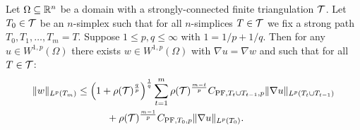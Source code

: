 \documentclass[12pt,a4paper]{article}
\begin{document}

\begin{theorem}\label{theorem:poincarefriedrichsestimate:grad}
    Let $\Omega \subseteq {\mathbb R}^{n}$ be a domain with a strongly-connected finite triangulation ${\mathcal T}$.
    Let $T_0 \in {\mathcal T}$ be an $n$-simplex such that for all $n$-simplices $T \in {\mathcal T}$ 
    we fix a strong path $T_0, T_1, \dots, T_m = T$.
    Suppose $1 \leq p,q \leq \infty$ with $1 = 1/p + 1/q$.
    Then for any $u \in W^{1,p}(\Omega)$ 
    there exists $w \in W^{1,p}(\Omega)$ with $\nabla u = \nabla w$ 
    and such that for all $T \in {\mathcal T}$:
    \begin{align*} %
        \| w \|_{L^{p}(T_m)}
        &\leq 
        \left( 1 + \rho(\calT)^{\frac q p} \right)^{\frac 1 q}
        \sum_{t=1}^{m}
        \rho(\calT)^{\frac{m-t}{p}}
        C_{{\rm{PF}},T_{t} \cup T_{t-1},p}
        \| \nabla u \|_{L^{p}(T_{t} \cup T_{t-1})}
        \\&\quad \quad \quad 
        +
        \rho(\calT)^{\frac{m-1}{p}}
        C_{{\rm{PF}},T_{0},p}
        \| \nabla u \|_{L^{p}(T_{0})}
        .
    \end{align*}
\end{theorem}
\end{document}
